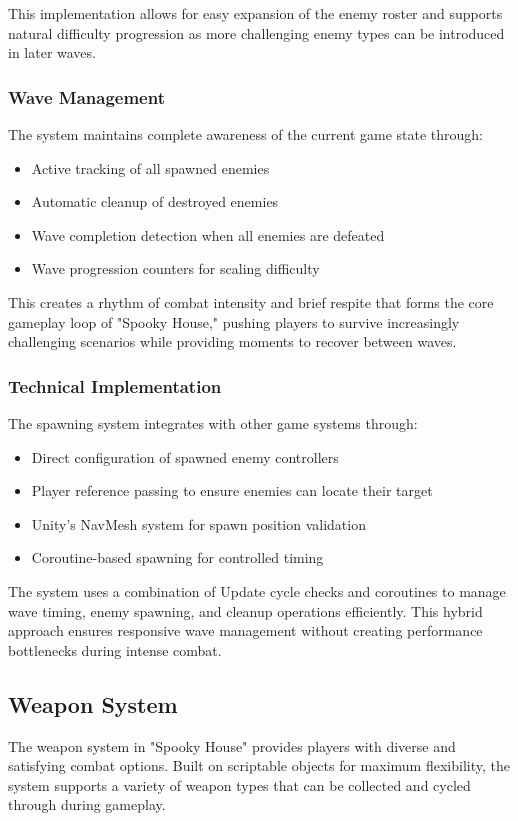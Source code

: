 \documentclass{article}
\begin{document}
    This implementation allows for easy expansion of the enemy roster and supports natural difficulty progression as more challenging enemy types can be introduced in later waves.

    \subsubsection{Wave Management}
    The system maintains complete awareness of the current game state through:

    \begin{itemize}
        \item Active tracking of all spawned enemies
        \item Automatic cleanup of destroyed enemies
        \item Wave completion detection when all enemies are defeated
        \item Wave progression counters for scaling difficulty
    \end{itemize}

    This creates a rhythm of combat intensity and brief respite that forms the core gameplay loop of "Spooky House," pushing players to survive increasingly challenging scenarios while providing moments to recover between waves.

    \subsubsection{Technical Implementation}
    The spawning system integrates with other game systems through:

    \begin{itemize}
        \item Direct configuration of spawned enemy controllers
        \item Player reference passing to ensure enemies can locate their target
        \item Unity's NavMesh system for spawn position validation
        \item Coroutine-based spawning for controlled timing
    \end{itemize}

    The system uses a combination of Update cycle checks and coroutines to manage wave timing, enemy spawning, and cleanup operations efficiently. This hybrid approach ensures responsive wave management without creating performance bottlenecks during intense combat.

    \subsection{Weapon System}
    The weapon system in "Spooky House" provides players with diverse and satisfying combat options. Built on scriptable objects for maximum flexibility, the system supports a variety of weapon types that can be collected and cycled through during gameplay.
\end{document}
